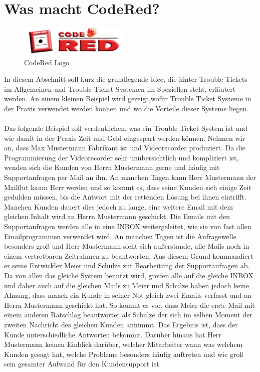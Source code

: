 \chapter{Was macht CodeRed?}  %
\label{chapter:Was macht CodeRed?}  %
\begin{figure}[h]
\begin{center}
   \includegraphics[width=150pt]{../bilder/crlogo.png}
   \caption{CodeRed Logo}
   \label{CodeRed Logo}
\end{center}
\end{figure}
In diesem Abschnitt soll kurz die grundlegende Idee, die hinter Trouble Tickets im Allgemeinen und Trouble Ticket Systemen im Speziellen steht, erläutert werden. An einem kleinen Beispiel wird gezeigt,wofür Trouble Ticket Systeme in der Praxis verwendet werden können und wo die Vorteile dieser Systeme liegen.\\
\\
Das folgende Beispiel soll verdeutlichen, was ein Trouble Ticket System ist und wie damit in der Praxis Zeit und Geld eingespart werden können.
Nehmen wir an, dass Max Mustermann Fabrikant ist und Videorecorder produziert. Da die
Programmierung der Videorecorder sehr unübersichtlich und kompliziert ist, wenden sich die Kunden von Herrn Mustermann gerne und häufig mit Supportanfragen per Mail an ihn. An manchen Tagen kann Herr Mustermann der Mailflut kaum Herr werden und so kommt es, dass seine Kunden sich einige Zeit gedulden müssen, bis die Antwort mit der rettenden Lösung bei ihnen eintrifft. Manchen Kunden dauert dies jedoch zu lange, eine weitere Email mit dem gleichen Inhalt wird an Herrn Mustermann geschickt.
Die Emails mit den Supportanfragen werden alle in eine INBOX weitergeleitet, wie sie von fast allen Emailprogrammen verwendet wird.
An manchen Tagen ist die Anfragewelle besonders groß und Herr Mustermann sieht sich außerstande, alle Mails noch in einem vertretbaren Zeitrahmen zu beantworten. Aus diesem Grund kommandiert er seine Entwickler Meier und Schulze zur Bearbeitung der Supportanfragen ab. Da von allen das gleiche System benutzt wird, greifen alle auf die gleiche INBOX und daher auch auf die gleichen Mails zu.Meier und Schulze haben jedoch keine Ahnung, dass manch ein Kunde in seiner Not gleich zwei Emails verfasst und an Herrn Mustermann geschickt hat. So kommt es vor, dass Meier die erste Mail mit einem
anderen Ratschlag beantwortet als Schulze der sich im selben Moment der zweiten Nachricht des gleichen Kunden annimmt. Das Ergebnis ist, dass der Kunde unterschiedliche Antworten bekommt. Darüber hinaus hat Herr Mustermann keinen Einblick darüber, welcher Mitarbeiter wann was welchem Kunden gesagt hat, welche Probleme besonders häufig auftreten und wie groß sein gesamter Aufwand für den Kundensupport ist.


